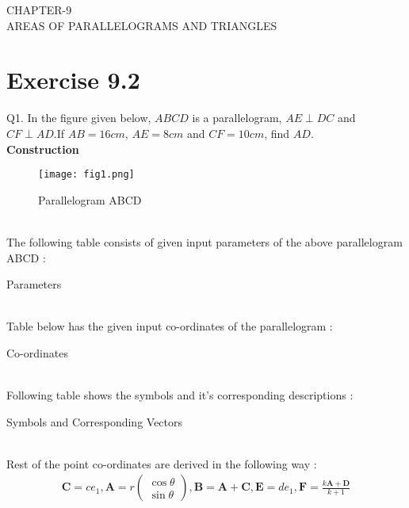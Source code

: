 \documentclass{article}
\newcommand{\myvec}[1]{\ensuremath{\begin{pmatrix}#1\end{pmatrix}}}
\let\vec\mathbf
\begin{document}
\begin{center}
        \textbf\large{CHAPTER-9 \\ AREAS OF PARALLELOGRAMS AND TRIANGLES}
\end{center}
\section{Exercise 9.2}
Q1. In the figure given below, $ABCD$ is a parallelogram, $AE \perp DC$ and $CF \perp AD$.If $AB = 16cm$, $AE = 8cm$ and $CF = 10cm$, find $AD$.\\
\textbf{Construction}\\
\begin{figure}[h]
 \begin{center}
  \texttt{[image: fig1.png]}
 \end{center}
 \caption{Parallelogram ABCD}
 \label{fig:Fig}
\end{figure}\\
\pagebreak
The following table consists of given input parameters of the above parallelogram ABCD :\\
\begin{table}[h]
\centering
	
	\caption{Parameters}
	\label{tab:table1}
\end{table}\\
Table below has the given input co-ordinates of the parallelogram :\\
\begin{table}[h]
	\centering
	
	\caption{Co-ordinates}
	\label{tab:table2}
\end{table}\\
Following table shows the symbols and it's corresponding descriptions :\\
\begin{table}[h]
	\centering
	
	\caption{Symbols and Corresponding Vectors}
	\label{tab:table3}
\end{table}\\
Rest of the point co-ordinates are derived in the following way : \\
\begin{align}
	\vec{C} = ce_1,\vec{A} = r\myvec{\cos{\theta}\\\sin{\theta}},\vec{B} = \vec{A} + \vec{C},\vec{E} = de_1,\vec{F} = \frac{k\vec{A} + \vec{D}}{k + 1}
\end{align}
\end{document}
